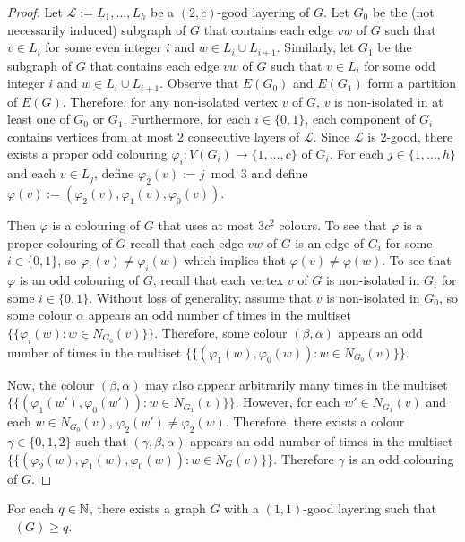 \documentclass{patmorin}
\DeclareMathOperator{\odd}{\chi_o}
\begin{document}
\begin{proof}
  Let $\mathcal{L}:=L_1,\ldots,L_h$ be a $(2,c)$-good layering of $G$.  Let $G_0$ be the (not necessarily induced) subgraph of $G$ that contains each edge $vw$ of $G$ such that $v\in L_i$ for some even integer $i$ and $w\in L_i\cup L_{i+1}$.  Similarly, let $G_1$ be the subgraph of $G$ that contains each edge $vw$ of $G$ such that $v\in L_i$ for some odd integer $i$ and $w\in L_i\cup L_{i+1}$.  Observe that $E(G_0)$ and $E(G_1)$ form a partition of $E(G)$.  Therefore, for any non-isolated vertex $v$ of $G$, $v$ is non-isolated in at least one of $G_0$ or $G_1$.  Furthermore, for each $i\in\{0,1\}$, each component of $G_i$ contains vertices from at most $2$ consecutive layers of $\mathcal{L}$.  Since $\mathcal{L}$ is $2$-good, there exists a proper odd colouring $\varphi_i:V(G_i)\to\{1,\ldots,c\}$ of $G_i$.  For each $j\in\{1,\ldots,h\}$ and each $v\in L_j$, define $\varphi_2(v):= j\bmod 3$ and define $\varphi(v):=(\varphi_2(v),\varphi_1(v),\varphi_0(v))$.

  Then $\varphi$ is a colouring of $G$ that uses at most $3c^2$ colours.  To see that $\varphi$ is a proper colouring of $G$ recall that each edge $vw$ of $G$ is an edge of $G_i$ for some $i\in\{0,1\}$, so $\varphi_i(v)\neq\varphi_i(w)$ which implies that $\varphi(v)\neq\varphi(w)$.  To see that $\varphi$ is an odd colouring of $G$, recall that each vertex $v$ of $G$ is non-isolated in $G_i$ for some $i\in\{0,1\}$.  Without loss of generality, assume that $v$ is non-isolated in $G_0$, so some colour $\alpha$ appears an odd number of times in the multiset $\{\{\varphi_i(w):w\in N_{G_0}(v)\}\}$. Therefore, some colour $(\beta,\alpha)$ appears an odd number of times in the multiset $\{\{(\varphi_1(w),\varphi_{0}(w)):w\in N_{G_0}(v)\}\}$.

  Now, the colour $(\beta,\alpha)$ may also appear arbitrarily many times in the multiset $\{\{(\varphi_1(w'),\varphi_{0}(w')):w\in N_{G_{1}}(v)\}\}$.  However, for each $w'\in N_{G_{1}}(v)$ and each $w\in N_{G_0}(v)$, $\varphi_2(w')\neq \varphi_2(w)$.  Therefore, there exists a colour $\gamma\in\{0,1,2\}$ such that $(\gamma,\beta,\alpha)$ appears an odd number of times in the multiset $\{\{(\varphi_2(w),\varphi_1(w),\varphi_{0}(w)):w\in N_{G}(v)\}\}$.  Therefore $\gamma$ is an odd colouring of $G$.
\end{proof}

\begin{obs}
  For each $q\in\mathbb{N}$, there exists a graph $G$ with a $(1,1)$-good layering such that $\odd(G)\ge q$.
\end{obs}
\end{document}
